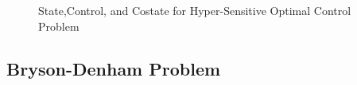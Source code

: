 \documentclass[10pt]{article}
\begin{document}
\begin{figure}[h]

\caption{State,Control, and Costate for Hyper-Sensitive Optimal Control Problem}
\end{figure}

\clearpage

\subsection{Bryson-Denham Problem}
\end{document}
